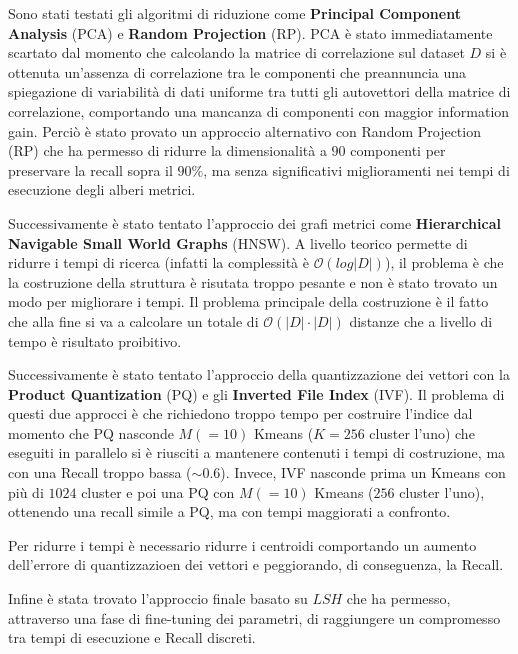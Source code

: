 Sono stati testati gli algoritmi di riduzione come \textbf{Principal Component Analysis} (PCA) 
e \textbf{Random Projection} (RP). PCA è stato immediatamente scartato dal momento che 
calcolando la matrice di correlazione sul dataset $D$ si è ottenuta un'assenza 
di correlazione tra le componenti che preannuncia una spiegazione di variabilità 
di dati uniforme tra tutti gli autovettori della matrice di correlazione, comportando 
una mancanza di componenti con maggior information gain. Perciò è stato provato 
un approccio alternativo con Random Projection (RP) che ha permesso di ridurre la 
dimensionalità a $90$ componenti per preservare la recall sopra il $90\%$, ma 
senza significativi miglioramenti nei tempi di esecuzione degli alberi metrici.

Successivamente è stato tentato l'approccio dei grafi metrici come \textbf{Hierarchical 
Navigable Small World Graphs} (HNSW). A livello teorico permette di ridurre i tempi
di ricerca (infatti la complessità è $\mathcal{O}(log |D|)$), il problema è 
che la costruzione della struttura è risutata troppo pesante e non è stato trovato 
un modo per migliorare i tempi. Il problema principale della costruzione è 
il fatto che alla fine si va a calcolare un totale di $\mathcal{O}(|D|\cdot |D|)$
distanze che a livello di tempo è risultato proibitivo.

Successivamente è stato tentato l'approccio della quantizzazione dei vettori con 
la \textbf{Product Quantization} (PQ) e gli \textbf{Inverted File Index} (IVF). Il problema di questi 
due approcci è che richiedono troppo tempo per costruire l'indice dal momento che 
PQ nasconde $M(=10)$ Kmeans ($K=256$ cluster l'uno) che eseguiti in parallelo si 
è riusciti a mantenere contenuti i tempi di costruzione, ma con una Recall troppo 
bassa ($\sim 0.6$). Invece, IVF nasconde prima un Kmeans con più di $1024$ cluster 
e poi una PQ con $M(=10)$ Kmeans ($256$ cluster l'uno), ottenendo una recall simile 
a PQ, ma con tempi maggiorati a confronto. 

Per ridurre i tempi è necessario ridurre i centroidi comportando un aumento dell'errore 
di quantizzazioen dei vettori e peggiorando, di conseguenza, la Recall.

Infine è stata trovato l'approccio finale basato su $LSH$ che ha permesso, attraverso 
una fase di fine-tuning dei parametri, di raggiungere un compromesso tra tempi di 
esecuzione e Recall discreti.








